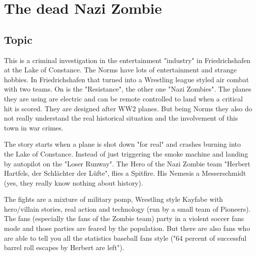 \chapter{The dead Nazi Zombie}
\label{ch:The Dead Nazi Zombie}



\section{Topic}

This is a criminal investigation in the entertainment "industry" in Friedrichshafen at the Lake of Constance.
The Norms have lots of entertainment and strange hobbies. In Friedrichshafen that turned into a Wrestling league styled air combat with two teams. On is the "Resistance", the other one "Nazi Zombies".
The planes they are using are electric and can be remote controlled to land when a critical hit is scored. They are designed after WW2 planes.
But being Norms they also do not really understand the real historical situation and the involvement of this town in war crimes.

The story starts when a plane is shot down "for real" and crashes burning into the Lake of Constance. Instead of just triggering the smoke machine and landing by autopilot on the "Loser Runway".
The Hero of the Nazi Zombie team "Herbert Hartfels, der Schlächter der Lüfte", flies a Spitfire.
His Nemesis a Messerschmidt (yes, they really know nothing about history).

The fights are a mixture of military pomp, Wrestling style Kayfabe with hero/villain stories, real action and technology (run by a small team of Pioneers).
The fans (especially the fans of the Zombie team) party in a violent soccer fans mode and those parties are feared by the population. But there are also fans who are able to tell you all the statistics baseball fans style ("64 percent of successful barrel roll escapes by Herbert are left").


